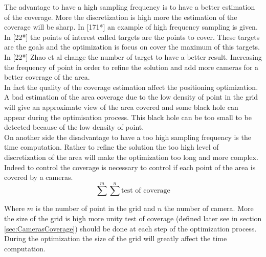 %
 
The advantage to have a high sampling frequency is to have a better estimation of the coverage. More the discretization is high more the estimation of the coverage will be sharp. In [171*] an example of high frequency sampling is given. 
In [22*] the points of interest called targets are the points to cover. These targets are the goals and the optimization is focus on cover the maximum of this targets. In [22*] Zhao et al change the number of target to have a better result. Increasing the frequency of point in order to refine the solution and add more cameras for a better coverage of the area.  \\
In fact the quality of the coverage estimation affect the positioning optimization. %
A bad estimation of the area coverage due to the low density of point in the grid will give an approximate view of the area covered and some black hole can appear during the optimisation process. This black hole can be too small to be detected because of the low density of point. 
\\
On another side the disadvantage to have a too high sampling frequency is the time computation. Rather to refine the solution the too high level of discretization of the area will make the optimization too long and more complex. Indeed to control the coverage is necessary to control if each point of the area is covered by a cameras.  
\begin{equation} 
	\sum^m \sum^n \mbox{test of coverage}
\end{equation}

Where $m$ is the number of point in the grid and $n$ the number of camera.  More the size of the grid is high more unity test of coverage (defined later see in section \ref{sec:CamerasCoverage}) should be done at each step of the optimization process. During the optimization the size of the grid will greatly affect the time computation.  \\


